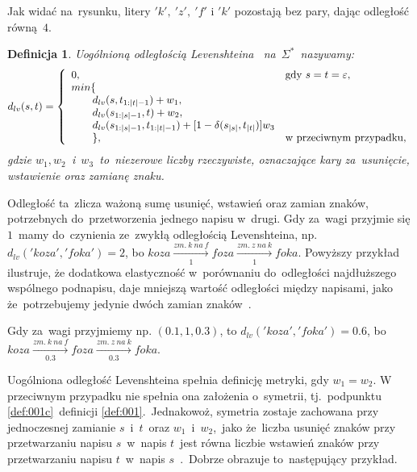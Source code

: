 \documentclass[12pt, twoside, openany]{report}
\theoremstyle{plain}
\newtheorem{defi}{Definicja}[section]
\begin{document}
Jak widać na~rysunku, litery $'k',\ 'z',\ 'f'$ i $'k'$ pozostają bez pary, dając odległość równą~$4$.

\begin{defi}
Uogólnioną \emph{odległością Levenshteina} \cite{Levenshtein1965:binarycodes}~na~$\Sigma^*$~nazywamy:
$$
d_{lv}(s, t) = \left\{
\begin{array}{l l}     
    0, & \text{gdy } s = t = \varepsilon,\\
    min\{ & \\
\qquad    d_{lv}(s, t_{1:|t|-1}) + w_1, & \\
\qquad    d_{lv}(s_{1:|s|-1}, t) + w_2, & \\
\qquad    d_{lv}(s_{1:|s|-1}, t_{1:|t|-1}) + [1-\delta(s_{|s|}, t_{|t|})]w_3 & \\
\qquad    \}, & \text{w przeciwnym przypadku},
\end{array}\right.
$$
gdzie $w_1, w_2$~i~$w_3$~to~niezerowe liczby rzeczywiste, oznaczające kary za~usunięcie, wstawienie oraz zamianę znaku.
\end{defi}

Odległość ta~zlicza ważoną sumę usunięć, wstawień oraz zamian znaków, potrzebnych do~przetworzenia jednego napisu w~drugi. Gdy za~wagi przyjmie się $1$~mamy do~czynienia ze~zwykłą odległością Levenshteina, np.~$d_{lv}('koza', 'foka') = 2$, bo $koza  \xrightarrow[1]{zm.\ k\ na\ f} foza  \xrightarrow[1]{zm.\ z\ na\ k} foka$. Powyższy przykład ilustruje, że dodatkowa elastyczność w~porównaniu do~odległości najdłuższego wspólnego podnapisu, daje mniejszą wartość odległości między napisami, jako że~potrzebujemy jedynie dwóch zamian znaków~\cite{Loo2014:stringdist}.

Gdy za~wagi przyjmiemy np. $(0.1, 1, 0.3)$, to $d_{lv}('koza', 'foka') = 0.6$, bo~$koza  \xrightarrow[0.3]{zm.\ k\ na\ f} foza  \xrightarrow[0.3]{zm.\ z\ na\ k} foka$.

Uogólniona odległość Levenshteina spełnia definicję metryki, gdy $w_1 = w_2$. W przeciwnym przypadku nie spełnia ona założenia o~symetrii, tj.~podpunktu \ref{def:001c}~definicji \ref{def:001}.~Jednakowoż, symetria zostaje zachowana przy jednoczesnej zamianie $s$~i~$t$~oraz $w_1$~i~$w_2$,~jako że~liczba usunięć znaków przy przetwarzaniu napisu $s$~w~napis $t$~jest równa liczbie wstawień znaków przy przetwarzaniu napisu $t$~w~napis $s$~\cite{Loo2014:stringdist}.~Dobrze obrazuje to~następujący przykład.
\end{document}
